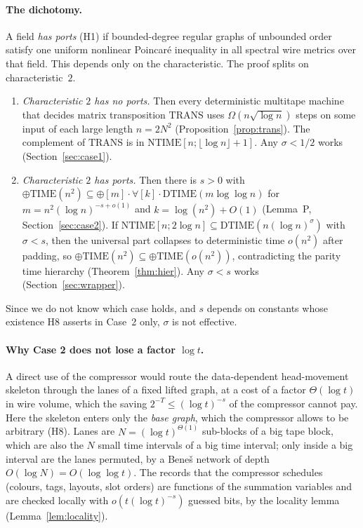 \documentclass[11pt]{article}
\theoremstyle{definition}
\theoremstyle{remark}
\newcommand{\DTIME}{\mathrm{DTIME}}
\newcommand{\NTIME}{\mathrm{NTIME}}
\newcommand{\parTIME}{\oplus\mathrm{TIME}}
\newcommand{\TRANS}{\mathrm{TRANS}}
\begin{document}
\paragraph{The dichotomy.} A field \emph{has ports} (H1) if bounded-degree regular graphs of unbounded order satisfy one
uniform nonlinear Poincar\'e inequality in all spectral wire metrics over that field. This depends only on the characteristic.
The proof splits on characteristic~$2$.
\begin{enumerate}
\item[\textbf{Case 1.}] \emph{Characteristic $2$ has no ports.} Then every deterministic multitape machine that decides matrix
transposition $\TRANS$ uses $\Omega(n\sqrt{\log n})$ steps on some input of each large length $n=2N^2$
(Proposition~\ref{prop:trans}). The complement of $\TRANS$ is in $\NTIME[n;\lfloor\log n\rfloor+1]$. Any $\sigma<1/2$ works
(Section~\ref{sec:case1}).
\item[\textbf{Case 2.}] \emph{Characteristic $2$ has ports.} Then there is $s>0$ with
$\parTIME(n^2)\subseteq\oplus[m]\cdot\forall[k]\cdot\DTIME(m\log\log n)$ for $m=n^2(\log n)^{-s+o(1)}$ and
$k=\log(n^2)+O(1)$ (Lemma~P, Section~\ref{sec:case2}). If $\NTIME[n;2\log n]\subseteq\DTIME(n(\log n)^{\sigma})$ with
$\sigma<s$, then the universal part collapses to deterministic time $o(n^2)$ after padding, so
$\parTIME(n^2)\subseteq\parTIME(o(n^2))$, contradicting the parity time hierarchy (Theorem~\ref{thm:hier}). Any
$\sigma<s$ works (Section~\ref{sec:wrapper}).
\end{enumerate}
Since we do not know which case holds, and $s$ depends on constants whose existence H8 asserts in Case~2 only, $\sigma$ is
not effective.

\paragraph{Why Case 2 does not lose a factor $\log t$.} A direct use of the compressor would route the data-dependent
head-movement skeleton through the lanes of a fixed lifted graph, at a cost of a factor $\Theta(\log t)$ in wire volume, which
the saving $2^{-T}\le(\log t)^{-s}$ of the compressor cannot pay. Here the skeleton enters only the \emph{base graph}, which the
compressor allows to be arbitrary (H8). Lanes are $N=(\log t)^{\Theta(1)}$ sub-blocks of a big tape block, which are also the
$N$ small time intervals of a big time interval; only inside a big interval are the lanes permuted, by a Bene\v{s} network of
depth $O(\log N)=O(\log\log t)$. The records that the compressor schedules (colours, tags, layouts, slot orders) are
functions of the summation variables and are checked locally with $o(t(\log t)^{-s})$ guessed bits, by the locality lemma
(Lemma~\ref{lem:locality}).
\end{document}
